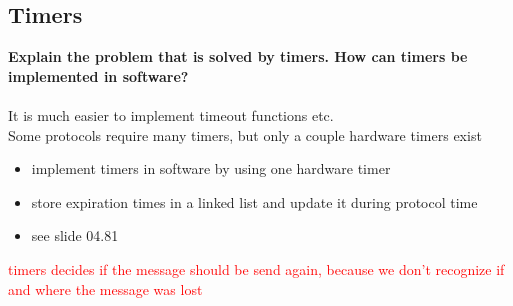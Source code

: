 \documentclass[a4paper,12pt]{article}
\newcommand*\red[1]{\textcolor{red}{#1}}
\begin{document}
	
	\subsection{Timers}
	\textbf{Explain the problem that is solved by timers. How can timers be implemented in software?}\\
	\\
	It is much easier to implement timeout functions etc.\\
	Some protocols require many timers, but only a couple hardware timers exist
	\begin{itemize}[itemsep=0pt]
		\item implement timers in software by using one hardware timer
		\item store expiration times in a linked list and update it during protocol time
		\item see slide 04.81 
	\end{itemize}
	\red{timers decides if the message should be send again, because we don't recognize if and where the message was lost}
	
	
	
\end{document}
